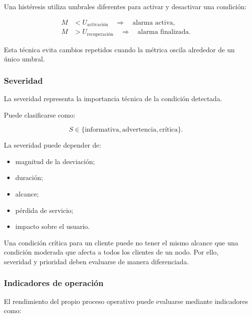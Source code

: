 Una histéresis utiliza umbrales diferentes para activar y desactivar una
condición:

\[
\begin{aligned}
    M
    &<
    U_{\mathrm{activación}}
    \quad
    \Longrightarrow
    \quad
    \text{alarma activa},\\
    M
    &>
    U_{\mathrm{recuperación}}
    \quad
    \Longrightarrow
    \quad
    \text{alarma finalizada}.
\end{aligned}
\]

Esta técnica evita cambios repetidos cuando la métrica oscila alrededor
de un único umbral.


\subsubsection*{Severidad}

La severidad representa la importancia técnica de la condición
detectada.

Puede clasificarse como:

\[
    S
    \in
    \{
        \text{informativa},
        \text{advertencia},
        \text{crítica}
    \}.
\]

La severidad puede depender de:

\begin{itemize}
    \item magnitud de la desviación;

    \item duración;

    \item alcance;

    \item pérdida de servicio;

    \item impacto sobre el usuario.
\end{itemize}

Una condición crítica para un cliente puede no tener el mismo alcance que
una condición moderada que afecta a todos los clientes de un nodo. Por
ello, severidad y prioridad deben evaluarse de manera diferenciada.


\subsubsection*{Indicadores de operación}

El rendimiento del propio proceso operativo puede evaluarse mediante
indicadores como:

